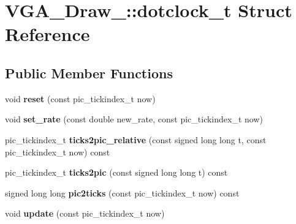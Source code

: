 \hypertarget{structVGA__Draw__2_1_1dotclock__t}{\section{V\-G\-A\-\_\-\-Draw\-\_\-:\-:dotclock\-\_\-t Struct Reference}
\label{structVGA__Draw__2_1_1dotclock__t}
}
\subsection*{Public Member Functions}
\begin{DoxyCompactItemize}
\item 
\hypertarget{structVGA__Draw__2_1_1dotclock__t_a8819f2a0fafa1186da9c225d241d050e}{void {\bfseries reset} (const pic\-\_\-tickindex\-\_\-t now)}\label{structVGA__Draw__2_1_1dotclock__t_a8819f2a0fafa1186da9c225d241d050e}

\item 
\hypertarget{structVGA__Draw__2_1_1dotclock__t_a6b0392a2da0abf74dd4313fbec8babff}{void {\bfseries set\-\_\-rate} (const double new\-\_\-rate, const pic\-\_\-tickindex\-\_\-t now)}\label{structVGA__Draw__2_1_1dotclock__t_a6b0392a2da0abf74dd4313fbec8babff}

\item 
\hypertarget{structVGA__Draw__2_1_1dotclock__t_a1a493a98a24c417a4ea0314445cc4dd6}{pic\-\_\-tickindex\-\_\-t {\bfseries ticks2pic\-\_\-relative} (const signed long long t, const pic\-\_\-tickindex\-\_\-t now) const }\label{structVGA__Draw__2_1_1dotclock__t_a1a493a98a24c417a4ea0314445cc4dd6}

\item 
\hypertarget{structVGA__Draw__2_1_1dotclock__t_a68a92c483f4c02bd1cf8cc6a9a40c271}{pic\-\_\-tickindex\-\_\-t {\bfseries ticks2pic} (const signed long long t) const }\label{structVGA__Draw__2_1_1dotclock__t_a68a92c483f4c02bd1cf8cc6a9a40c271}

\item 
\hypertarget{structVGA__Draw__2_1_1dotclock__t_afc683d2f4842d69549405c1636d2e6df}{signed long long {\bfseries pic2ticks} (const pic\-\_\-tickindex\-\_\-t now) const }\label{structVGA__Draw__2_1_1dotclock__t_afc683d2f4842d69549405c1636d2e6df}

\item 
\hypertarget{structVGA__Draw__2_1_1dotclock__t_aae002c924ba6d433b425fbd2e6ef0833}{void {\bfseries update} (const pic\-\_\-tickindex\-\_\-t now)}\label{structVGA__Draw__2_1_1dotclock__t_aae002c924ba6d433b425fbd2e6ef0833}


\end{DoxyCompactItemize}
